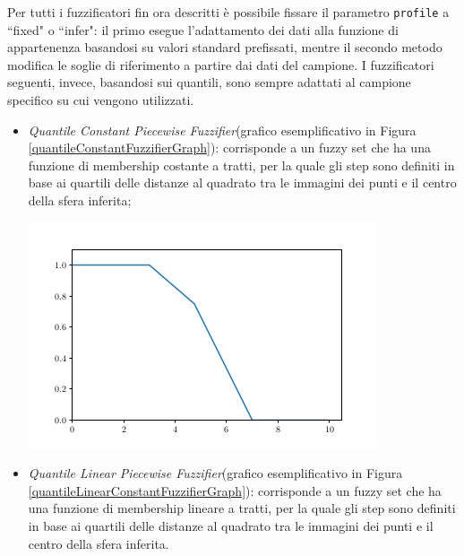 \documentclass[12pt,a4paper]{report}
\begin{document}
Per tutti i fuzzificatori fin ora descritti è possibile fissare il parametro \texttt{profile} a ``fixed" o ``infer": il primo esegue l'adattamento dei dati alla funzione di appartenenza basandosi su valori standard prefissati, mentre il secondo metodo modifica le soglie di riferimento a partire dai dati del campione. I fuzzificatori seguenti, invece, basandosi sui quantili, sono sempre adattati al campione specifico su cui vengono utilizzati.

\begin{itemize}
\item \emph{Quantile Constant Piecewise Fuzzifier}(grafico esemplificativo in Figura \ref{quantileConstantFuzzifierGraph}):  corrisponde a un fuzzy set che ha una funzione di membership costante a tratti, per la quale gli step sono definiti in base ai quartili delle distanze al quadrato tra le immagini dei punti e il centro della sfera inferita; 

\begin{minipage}{\linewidth}
	\centering
       \includegraphics[width=0.8\linewidth]{images/quantileConstantPiecewiseFuzzifier.png}
	\label{quantileConstantFuzzifierGraph}
\end{minipage}

\item \emph{Quantile Linear Piecewise Fuzzifier}(grafico esemplificativo in Figura \ref{quantileLinearConstantFuzzifierGraph}):  corrisponde a un fuzzy set che ha una funzione di membership lineare a tratti, per la quale gli step sono definiti in base ai quartili delle distanze al quadrato tra le immagini dei punti e il centro della sfera inferita.


\end{itemize}
\end{document}
